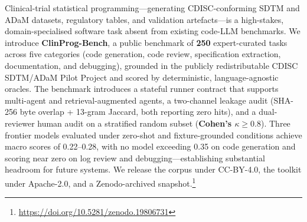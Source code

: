 Clinical-trial statistical programming---generating CDISC-conforming SDTM and ADaM
datasets, regulatory tables, and validation artefacts---is a high-stakes,
domain-specialised software task absent from existing code-LLM benchmarks. We
introduce \textbf{ClinProg-Bench}, a public benchmark of \textbf{250} expert-curated
tasks across five categories (code generation, code review, specification
extraction, documentation, and debugging), grounded in the publicly redistributable
CDISC SDTM/ADaM Pilot Project and scored by deterministic, language-agnostic
oracles. The benchmark introduces a stateful runner contract that supports
multi-agent and retrieval-augmented agents, a two-channel leakage audit
(SHA-256 byte overlap + 13-gram Jaccard, both reporting zero hits), and a
dual-reviewer human audit on a stratified random subset (\textbf{Cohen's $\kappa
\geq 0.8$}). Three frontier models evaluated under zero-shot and
fixture-grounded conditions achieve macro scores of 0.22--0.28, with no model
exceeding 0.35 on code generation and scoring near zero on log review and
debugging---establishing substantial headroom for future systems. We release
the corpus under CC-BY-4.0, the toolkit under Apache-2.0, and a Zenodo-archived
snapshot.\footnote{\url{https://doi.org/10.5281/zenodo.19806731}}
